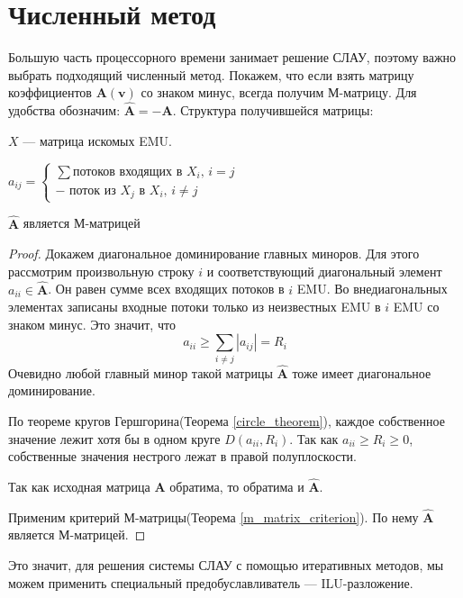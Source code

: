 \documentclass[14pt, a4paper]{extreport}
\begin{document}
\clearpage
\section{Численный метод}
Большую часть процессорного времени занимает решение СЛАУ, поэтому важно выбрать подходящий численный метод. Покажем, что если взять матрицу коэффициентов $\mathbf{A}(\mathbf{v})$ со знаком минус, всегда получим М-матрицу. Для удобства обозначим: $\hat{\mathbf{A}} = -\mathbf{A}$. Структура получившейся матрицы:

$X$ --- матрица искомых EMU.

$a_{ij} = 
\begin{cases} 
\text{$\sum$потоков входящих в $X_i$, $i=j$}\\
\text{$-$ поток из $X_j$ в $X_i$, $i\neq{}j$}
\end{cases}
$



\begin{theorem}
	$\hat{\mathbf{A}}$ является М-матрицей
\end{theorem}

\begin{proof}
	Докажем диагональное доминирование главных миноров. Для этого рассмотрим произвольную строку $i$ и соответствующий диагональный элемент $a_{ii} \in \hat{\mathbf{A}}$. Он равен сумме всех входящих потоков в $i$ EMU. Во внедиагональных элементах записаны входные потоки только из неизвестных EMU в $i$ EMU со знаком минус. Это значит, что $$a_{ii} \geq \sum_{i \neq j} |a_{ij}| = R_i$$Очевидно любой главный минор такой матрицы $\hat{\mathbf{A}}$ тоже имеет диагональное доминирование. 
	
	По теореме кругов Гершгорина(Теорема \ref{circle_theorem}), каждое собственное значение лежит хотя бы в одном круге $D(a_{ii}, R_i)$. Так как $a_{ii} \geq R_i \geq 0$, собственные значения нестрого лежат в правой полуплоскости.
	
	Так как исходная матрица $\mathbf{A}$ обратима, то обратима и $\hat{\mathbf{A}}$.
	
	Применим критерий М-матрицы(Теорема \ref{m_matrix_criterion}). По нему $\hat{\mathbf{A}}$ является М-матрицей.	
\end{proof}

Это значит, для решения системы СЛАУ с помощью итеративных методов, мы можем применить специальный предобуславливатель --- ILU-разложение. 

\clearpage
\end{document}

